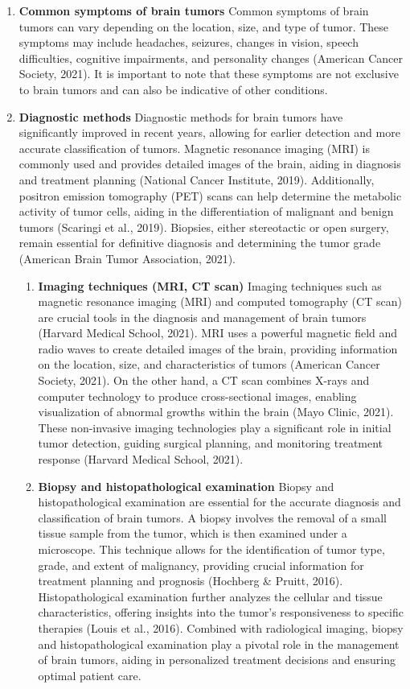 \documentclass[12pt,oneside]{report}
\begin{document}
\begin{enumerate}
\item \textbf{Common symptoms of brain tumors}
Common symptoms of brain tumors can vary depending on the location, size, and type of tumor. These symptoms may include headaches, seizures, changes in vision, speech difficulties, cognitive impairments, and personality changes (American Cancer Society, 2021). It is important to note that these symptoms are not exclusive to brain tumors and can also be indicative of other conditions.

\item \textbf{Diagnostic methods}
Diagnostic methods for brain tumors have significantly improved in recent years, allowing for earlier detection and more accurate classification of tumors. Magnetic resonance imaging (MRI) is commonly used and provides detailed images of the brain, aiding in diagnosis and treatment planning (National Cancer Institute, 2019). Additionally, positron emission tomography (PET) scans can help determine the metabolic activity of tumor cells, aiding in the differentiation of malignant and benign tumors (Scaringi et al., 2019). Biopsies, either stereotactic or open surgery, remain essential for definitive diagnosis and determining the tumor grade (American Brain Tumor Association, 2021).

\begin{enumerate}
\item \textbf{Imaging techniques (MRI, CT scan)}
Imaging techniques such as magnetic resonance imaging (MRI) and computed tomography (CT scan) are crucial tools in the diagnosis and management of brain tumors (Harvard Medical School, 2021). MRI uses a powerful magnetic field and radio waves to create detailed images of the brain, providing information on the location, size, and characteristics of tumors (American Cancer Society, 2021). On the other hand, a CT scan combines X-rays and computer technology to produce cross-sectional images, enabling visualization of abnormal growths within the brain (Mayo Clinic, 2021). These non-invasive imaging technologies play a significant role in initial tumor detection, guiding surgical planning, and monitoring treatment response (Harvard Medical School, 2021).

\item \textbf{Biopsy and histopathological examination}
Biopsy and histopathological examination are essential for the accurate diagnosis and classification of brain tumors. A biopsy involves the removal of a small tissue sample from the tumor, which is then examined under a microscope. This technique allows for the identification of tumor type, grade, and extent of malignancy, providing crucial information for treatment planning and prognosis (Hochberg \& Pruitt, 2016). Histopathological examination further analyzes the cellular and tissue characteristics, offering insights into the tumor's responsiveness to specific therapies (Louis et al., 2016). Combined with radiological imaging, biopsy and histopathological examination play a pivotal role in the management of brain tumors, aiding in personalized treatment decisions and ensuring optimal patient care.


\end{enumerate}
\end{enumerate}
\end{document}
